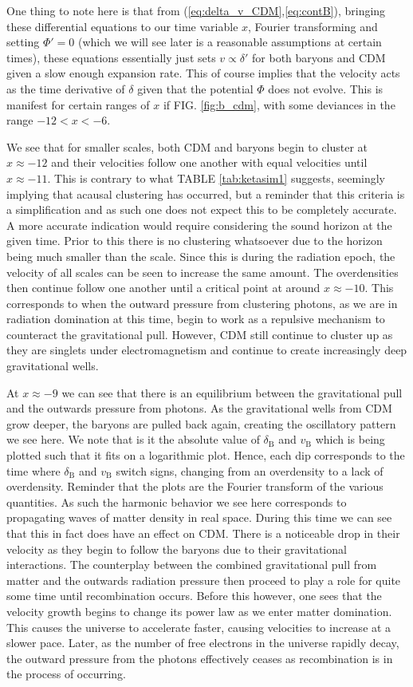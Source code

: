 \documentclass[%
reprint,
 amsmath,amssymb,
 aps,
]{revtex4-2}
\begin{document}
One thing to note here is that from (\ref{eq:delta_v_CDM},\ref{eq:contB}), bringing these differential equations to our time variable $x$, Fourier transforming and setting $\Phi'=0$ (which we will see later is a reasonable assumptions at certain times), these equations essentially just sets $v\propto\delta'$ for both baryons and CDM given a slow enough expansion rate. This of course implies that the velocity acts as the time derivative of $\delta$ given that the potential $\Phi$ does not evolve. This is manifest for certain ranges of $x$ if FIG. \ref{fig:b_cdm}, with some deviances in the range $-12<x<-6$.

We see that for smaller scales, both CDM and baryons begin to cluster at $x\approx-12$ and their velocities follow one another with equal velocities until $x\approx-11$. This is contrary to what TABLE \ref{tab:ketasim1} suggests, seemingly implying that acausal clustering has occurred, but a reminder that this criteria is a simplification and as such one does not expect this to be completely accurate. A more accurate indication would require considering the sound horizon at the given time. Prior to this there is no clustering whatsoever due to the horizon being much smaller than the scale. Since this is during the radiation epoch, the velocity of all scales can be seen to increase the same amount. The overdensities then continue follow one another until a critical point at around $x\approx-10$. This corresponds to when the outward pressure from clustering photons, as we are in radiation domination at this time, begin to work as a repulsive mechanism to counteract the gravitational pull. However, CDM still continue to cluster up as they are singlets under electromagnetism and continue to create increasingly deep gravitational wells. 

At $x\approx-9$ we can see that there is an equilibrium between the gravitational pull and the outwards pressure from photons. As the gravitational wells from CDM grow deeper, the baryons are pulled back again, creating the oscillatory pattern we see here. We note that is it the absolute value of $\delta_\text{B}$ and $v_\text{B}$ which is being plotted such that it fits on a logarithmic plot. Hence, each dip corresponds to the time where $\delta_\text{B}$ and $v_\text{B}$ switch signs, changing from an overdensity to a lack of overdensity. Reminder that the plots are the Fourier transform of the various quantities. As such the harmonic behavior we see here corresponds to propagating waves of matter density in real space. During this time we can see that this in fact does have an effect on CDM. There is a noticeable drop in their velocity as they begin to follow the baryons due to their gravitational interactions. The counterplay between the combined gravitational pull from matter and the outwards radiation pressure then proceed to play a role for quite some time until recombination occurs. Before this however, one sees that the velocity growth begins to change its power law as we enter matter domination. This causes the universe to accelerate faster, causing velocities to increase at a slower pace. Later, as the number of free electrons in the universe rapidly decay, the outward pressure from the photons effectively ceases as recombination is in the process of occurring. 
\end{document}
